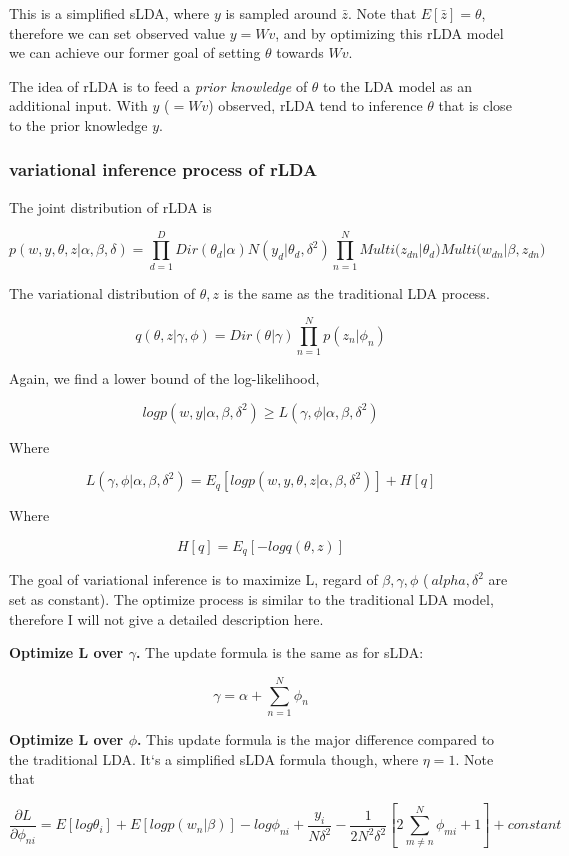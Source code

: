 \documentclass[12pt,a4paper]{ctexart}
\begin{document}
This is a simplified sLDA, where $y$ is sampled around $\bar{z}$. Note that $E[\bar{z}] = \theta$, therefore we can set observed value $y = Wv$, and by optimizing this rLDA model we can achieve our former goal of setting $\theta$ towards $Wv$.

The idea of rLDA is to feed a \textit{prior knowledge} of $\theta$ to the LDA model as an  additional input. With $y$ ($= Wv$) observed, rLDA tend to inference $\theta$ that is close to the prior knowledge $y$.

\subsubsection{variational inference process of rLDA}

The joint distribution of rLDA is

$$p(w,y,\theta,z|\alpha, \beta, \delta)=\prod_{d=1}^{D}{Dir(\theta_d|\alpha)N(y_d|\theta_d, \delta^2)\prod_{n=1}^{N}{Multi(z_{dn}|\theta_d)Multi(w_{dn}|\beta, z_{dn}})}$$

The variational distribution of $\theta, z$ is the same as the traditional LDA process.

$$q(\theta, z| \gamma, \phi) = Dir(\theta|\gamma)\prod_{n=1}^{N}{p(z_n|\phi_n)}$$

Again, we find a lower bound of the log-likelihood,

$$log p(w,y|\alpha, \beta, \delta^2) \geq L(\gamma, \phi|\alpha, \beta, \delta^2)$$

Where

$$L(\gamma, \phi | \alpha, \beta, \delta^2) = E_q[logp(w, y, \theta, z|\alpha, \beta, \delta^2)] + H[q]$$

Where

$$H[q]=E_q[-logq(\theta, z)]$$

The goal of variational inference is to maximize L, regard of $\beta, \gamma, \phi$ ($\
alpha, \delta^2$ are set as constant). The optimize process is similar to the traditional LDA model, therefore I will not give a detailed description here. 

\textbf{Optimize L over $\gamma$.} The update formula is the same as for sLDA:

$$\gamma = \alpha + \sum_{n=1}^{N}\phi_{n}$$

\textbf{Optimize L over $\phi$.} This update formula is the major difference compared to the traditional LDA. It`s a simplified sLDA formula though, where $\eta = 1$. Note that

$$\frac{\partial L}{\partial \phi_{ni}} = E[log\theta_i]+E[logp(w_n|\beta)] - log\phi_{ni} + \frac{y_i}{N\delta^2} - \frac{1}{2N^2\delta^2}[2\sum_{m \neq n}^{N}{\phi_{mi}} + 1] + constant$$
\end{document}
